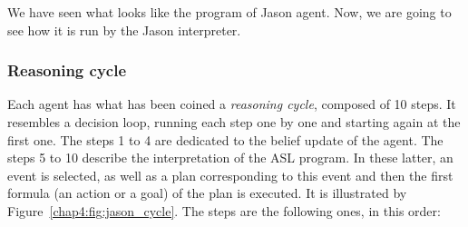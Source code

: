 \documentclass[a4paper,11pt,twoside]{StyleThese}
\begin{document}
We have seen what looks like the program of Jason agent. Now, we are going to see how it is run by the Jason interpreter.


\subsubsection{Reasoning cycle} Each agent has what has been coined a \textit{reasoning cycle}, composed of 10 steps. It resembles a decision loop, running each step one by one and starting again at the first one. The steps 1 to 4 are dedicated to the belief update of the agent. The steps 5 to 10 describe the interpretation of the ASL program. In these latter, an event is selected, as well as a plan corresponding to this event and then the first formula (\eg an action or a goal) of the plan is executed. It is illustrated by Figure~\ref{chap4:fig:jason_cycle}. The steps are the following ones, in this order:
\end{document}
